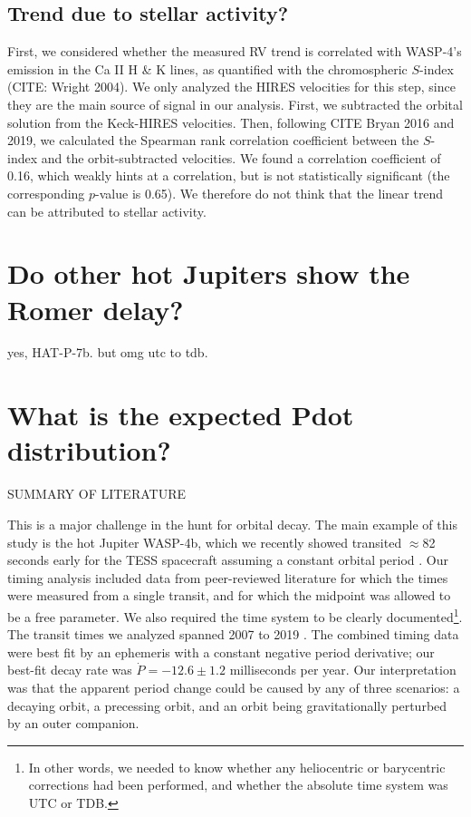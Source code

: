 \documentclass[RNAAS]{aastex62}
\begin{document}
\subsection{Trend due to stellar activity?}

First, we considered whether the measured RV trend is correlated with
WASP-4's emission in the Ca II H \& K lines, as quantified with the
chromospheric $S$-index (CITE: Wright 2004).  We only analyzed the
HIRES velocities for this step, since they are the main source of
signal in our analysis.  First, we subtracted the orbital solution
from the Keck-HIRES velocities.  Then, following CITE Bryan 2016 and
2019, we calculated the Spearman rank correlation coefficient between
the $S$-index and the orbit-subtracted velocities.  We found a
correlation coefficient of 0.16, which weakly hints at a correlation,
but is not statistically significant (the corresponding $p$-value is
0.65).  We therefore do not think that the linear trend can be
attributed to stellar activity.




\section{Do other hot Jupiters show the Romer delay?}
yes, HAT-P-7b. but omg utc to tdb.


\section{What is the expected Pdot distribution?}






SUMMARY OF LITERATURE

This is a major challenge in the hunt for orbital decay.  The main
example of this study is the hot Jupiter WASP-4b, which we recently
showed transited $\approx$82 seconds early for the TESS spacecraft
assuming a constant orbital period \citep{bouma_wasp-4b_2019}.  Our
timing analysis included data from peer-reviewed literature for which
the times were measured from a single transit, and for which the
midpoint was allowed to be a free parameter. We also required the time
system to be clearly documented\footnote{In other words, we needed to
know whether any heliocentric or barycentric corrections had been
performed, and whether the absolute time system was UTC or TDB.}. The
transit times we analyzed spanned 2007 to 2019
\citep{wilson_wasp-4b_2008,gillon_improved_2009,winn_transit_2009,dragomir_terms_2011,sanchis-ojeda_starspots_2011,nikolov_wasp-4b_2012,hoyer_tramos_2013,ranjan_atmospheric_2014,huitson_gemini_2017}.
The combined timing data were best fit by an ephemeris with a constant
negative period derivative; our best-fit decay rate was $\dot{P} =
-12.6 \pm 1.2$ milliseconds per year.  Our interpretation was that the
apparent period change could be caused by any of three scenarios: a
decaying orbit, a precessing orbit, and an orbit being gravitationally
perturbed by an outer companion.
\end{document}
